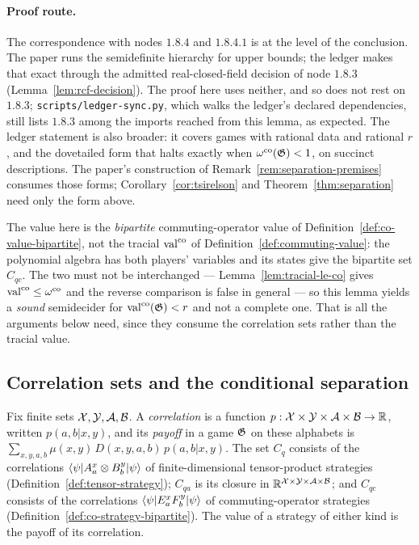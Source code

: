 \paragraph{Proof route.} The correspondence with nodes $1.8.4$ and $1.8.4.1$ is at the level
of the conclusion. The paper runs the semidefinite hierarchy for upper bounds; the ledger makes
that exact through the admitted real-closed-field decision of node $1.8.3$
(Lemma~\ref{lem:rcf-decision}). The proof here uses neither, and so does not rest on $1.8.3$;
\texttt{scripts/ledger-sync.py}, which walks the ledger's declared dependencies, still lists
$1.8.3$ among the imports reached from this lemma, as expected. The ledger statement is also
broader: it covers games with rational data and rational $r$, and the dovetailed form that
halts exactly when $\omega^{\mathrm{co}}(\mathfrak{G}) < 1$, on succinct descriptions. The paper's construction
of Remark~\ref{rem:separation-premises} consumes those forms; Corollary~\ref{cor:tsirelson} and
Theorem~\ref{thm:separation} need only the form above.

The value here is the \emph{bipartite} commuting-operator value of
Definition~\ref{def:co-value-bipartite}, not the tracial $\mathrm{val}^{\mathrm{co}}$ of
Definition~\ref{def:commuting-value}: the polynomial algebra has both players' variables and
its states give the bipartite set $C_{qc}$. The two must not be interchanged ---
Lemma~\ref{lem:tracial-le-co} gives $\mathrm{val}^{\mathrm{co}} \leq \omega^{\mathrm{co}}$ and the reverse comparison is false
in general --- so this lemma yields a \emph{sound} semidecider for $\mathrm{val}^{\mathrm{co}}(\mathfrak{G}) < r$ and not
a complete one. That is all the arguments below need, since they consume the correlation sets
rather than the tracial value.

\subsection{Correlation sets and the conditional separation}

\begin{definition}
\label{def:correlation-sets}
\leanok
Fix finite sets $\mathcal{X}, \mathcal{Y}, \mathcal{A}, \mathcal{B}$. A \emph{correlation} is a function
$p : \mathcal{X} \times \mathcal{Y} \times \mathcal{A} \times \mathcal{B} \to \mathbb{R}$, written $p(a,b|x,y)$, and its
\emph{payoff} in a game $\mathfrak{G}$ on these alphabets is
$\sum_{x,y,a,b} \mu(x,y)\, D(x,y,a,b)\, p(a,b|x,y)$. The set $C_q$ consists of the
correlations $\langle\psi| A^x_a \otimes B^y_b |\psi\rangle$ of finite-dimensional
tensor-product strategies (Definition~\ref{def:tensor-strategy}); $C_{qa}$ is its closure
in $\mathbb{R}^{\mathcal{X} \times \mathcal{Y} \times \mathcal{A} \times \mathcal{B}}$; and $C_{qc}$ consists of the correlations
$\langle\psi| E^x_a F^y_b |\psi\rangle$ of commuting-operator strategies
(Definition~\ref{def:co-strategy-bipartite}). The value of a strategy of either kind is
the payoff of its correlation.
\end{definition}

